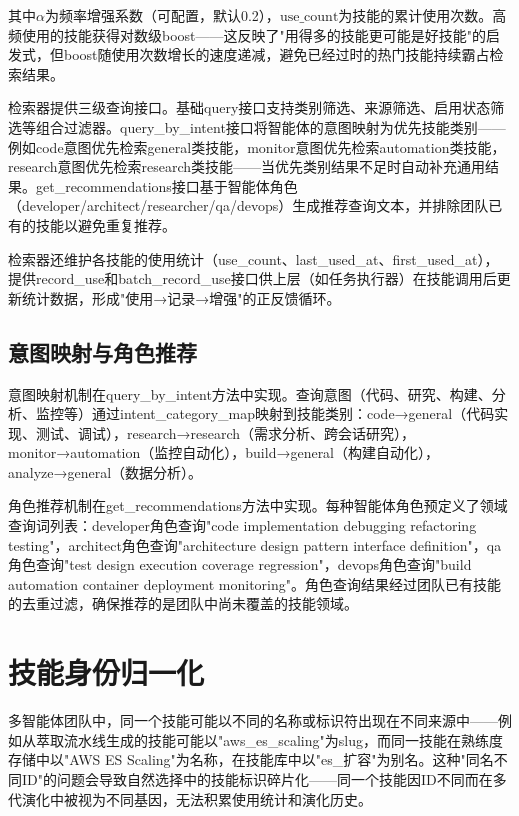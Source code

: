 \documentclass[conference]{IEEEtran}
\begin{document}
其中$\alpha$为频率增强系数（可配置，默认0.2），$\mathrm{use\_count}$为技能的累计使用次数。高频使用的技能获得对数级boost——这反映了"用得多的技能更可能是好技能"的启发式，但boost随使用次数增长的速度递减，避免已经过时的热门技能持续霸占检索结果。

检索器提供三级查询接口。基础query接口支持类别筛选、来源筛选、启用状态筛选等组合过滤器。query\_by\_intent接口将智能体的意图映射为优先技能类别——例如code意图优先检索general类技能，monitor意图优先检索automation类技能，research意图优先检索research类技能——当优先类别结果不足时自动补充通用结果。get\_recommendations接口基于智能体角色（developer/architect/researcher/qa/devops）生成推荐查询文本，并排除团队已有的技能以避免重复推荐。

检索器还维护各技能的使用统计（use\_count、last\_used\_at、first\_used\_at），提供record\_use和batch\_record\_use接口供上层（如任务执行器）在技能调用后更新统计数据，形成"使用→记录→增强"的正反馈循环。

\subsection{意图映射与角色推荐}

意图映射机制在query\_by\_intent方法中实现。查询意图（代码、研究、构建、分析、监控等）通过intent\_category\_map映射到技能类别：code→general（代码实现、测试、调试），research→research（需求分析、跨会话研究），monitor→automation（监控自动化），build→general（构建自动化），analyze→general（数据分析）。

角色推荐机制在get\_recommendations方法中实现。每种智能体角色预定义了领域查询词列表：developer角色查询"code implementation debugging refactoring testing"，architect角色查询"architecture design pattern interface definition"，qa角色查询"test design execution coverage regression"，devops角色查询"build automation container deployment monitoring"。角色查询结果经过团队已有技能的去重过滤，确保推荐的是团队中尚未覆盖的技能领域。

\section{技能身份归一化}

多智能体团队中，同一个技能可能以不同的名称或标识符出现在不同来源中——例如从萃取流水线生成的技能可能以"aws\_es\_scaling"为slug，而同一技能在熟练度存储中以"AWS ES Scaling"为名称，在技能库中以"es\_扩容"为别名。这种"同名不同ID"的问题会导致自然选择中的技能标识碎片化——同一个技能因ID不同而在多代演化中被视为不同基因，无法积累使用统计和演化历史。
\end{document}
